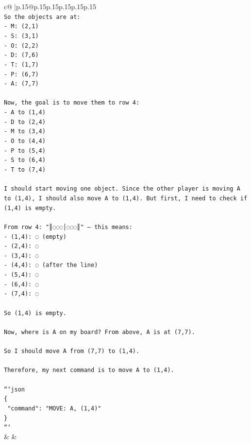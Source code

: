 \documentclass{article}
\begin{document}
{\begin{supertabular}{c@{$\;$}|p{.15\linewidth}@{}p{.15\linewidth}p{.15\linewidth}p{.15\linewidth}p{.15\linewidth}p{.15\linewidth}}
{{{\\ 
\texttt{So the objects are at:} \\
\texttt{{-} M: (2,1)} \\
\texttt{{-} S: (3,1)} \\
\texttt{{-} O: (2,2)} \\
\texttt{{-} D: (7,6)} \\
\texttt{{-} T: (1,7)} \\
\texttt{{-} P: (6,7)} \\
\texttt{{-} A: (7,7)} \\
\\ 
\texttt{Now, the goal is to move them to row 4:} \\
\texttt{{-} A to (1,4)} \\
\texttt{{-} D to (2,4)} \\
\texttt{{-} M to (3,4)} \\
\texttt{{-} O to (4,4)} \\
\texttt{{-} P to (5,4)} \\
\texttt{{-} S to (6,4)} \\
\texttt{{-} T to (7,4)} \\
\\ 
\texttt{I should start moving one object. Since the other player is moving A to (1,4), I should also move A to (1,4). But first, I need to check if (1,4) is empty.} \\
\\ 
\texttt{From row 4: "║◌◌◌│◌◌◌║" — this means:} \\
\texttt{{-} (1,4): ◌ (empty)} \\
\texttt{{-} (2,4): ◌} \\
\texttt{{-} (3,4): ◌} \\
\texttt{{-} (4,4): ◌ (after the line)} \\
\texttt{{-} (5,4): ◌} \\
\texttt{{-} (6,4): ◌} \\
\texttt{{-} (7,4): ◌} \\
\\ 
\texttt{So (1,4) is empty.} \\
\\ 
\texttt{Now, where is A on my board? From above, A is at (7,7).} \\
\\ 
\texttt{So I should move A from (7,7) to (1,4).} \\
\\ 
\texttt{Therefore, my next command is to move A to (1,4).} \\
\\ 
\texttt{```json} \\
\texttt{\{} \\
\texttt{  "command": "MOVE: A, (1,4)"} \\
\texttt{\}} \\
\texttt{```} \\
            }
        }
    }
    & & \\ \\


\end{supertabular}}
\end{document}
